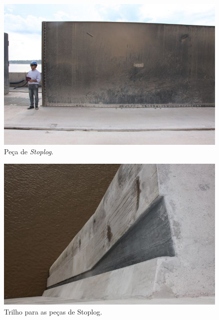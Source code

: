 \begin{figure}[h!]
    \centering \includegraphics[width=0.6\columnwidth]{figs/jirau/jirau_14}
    \caption{Peça de \emph{Stoplog}.}
    \label{fig:jirau14}
\end{figure}

\begin{figure}[h!]
    \centering \includegraphics[width=0.6\columnwidth]{figs/jirau/jirau_15}
    \caption{Trilho para as peças de Stoplog.}
    \label{fig:jirau15}
\end{figure}

